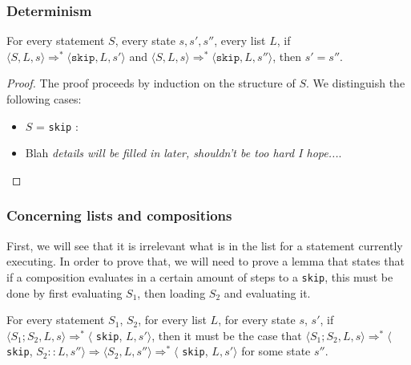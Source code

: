 \subsubsection*{Determinism}

\begin{theorem}
For every statement $S$, every state $s, s', s''$, every list $L$, if $\langle S, L, s \rangle \Rightarrow ^{*} \langle \texttt{skip}, L, s' \rangle$ and $\langle S, L, s \rangle \Rightarrow ^{*} \langle \texttt{skip}, L, s'' \rangle$, then $s' = s''$.
\end{theorem}

\begin{proof}
The proof proceeds by induction on the structure of $S$. We distinguish the following cases:
\begin{itemize}[noitemsep]
    \item $S$ = \texttt{skip} : 
    \item Blah \emph{details will be filled in later, shouldn't be too hard I hope...}.
\end{itemize}
\end{proof}

\subsubsection*{Concerning lists and compositions}
First, we will see that it is irrelevant what is in the list for a statement currently executing. In order to prove that, we will need to prove a lemma that states that if a composition evaluates in a certain amount of steps to a \texttt{skip}, this must be done by first evaluating $S_1$, then loading $S_2$ and evaluating it. 

\begin{lemma}
\label{breakingdowncomp}
For every statement $S_1$, $S_2$, for every list $L$, for every state $s$, $s'$, if $\langle S_1; S_2, L, s \rangle \Rightarrow ^{*} \langle$ \texttt{skip}, $L, s' \rangle$, then it must be the case that $\langle S_1;S_2, L, s \rangle \Rightarrow ^{*} \langle$ \texttt{skip}, $S_2::L, s'' \rangle \Rightarrow \langle S_2, L, s'' \rangle \Rightarrow ^{*} \langle$ \texttt{skip}, $L, s' \rangle$ for some state $s''$. 
\end{lemma}


